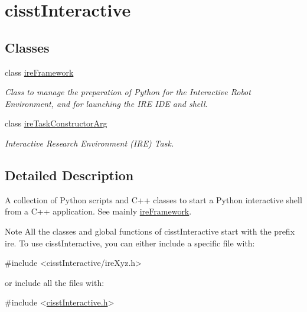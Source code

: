 \hypertarget{group__cisst_interactive}{\section{cisst\-Interactive}
\label{group__cisst_interactive}
}
\subsection*{Classes}
\begin{DoxyCompactItemize}
\item 
class \hyperlink{classire_framework}{ire\-Framework}
\begin{DoxyCompactList}\small\item\em Class to manage the preparation of Python for the Interactive Robot Environment, and for launching the I\-R\-E I\-D\-E and shell. \end{DoxyCompactList}\item 
class \hyperlink{classire_task_constructor_arg}{ire\-Task\-Constructor\-Arg}
\begin{DoxyCompactList}\small\item\em Interactive Research Environment (I\-R\-E) Task. \end{DoxyCompactList}\end{DoxyCompactItemize}


\subsection{Detailed Description}
A collection of Python scripts and C++ classes to start a Python interactive shell from a C++ application. See mainly \hyperlink{classire_framework}{ire\-Framework}.

\begin{DoxyNote}{Note}
All the classes and global functions of cisst\-Interactive start with the prefix ire. To use cisst\-Interactive, you can either include a specific file with\-: 
\begin{DoxyCode}
\textcolor{preprocessor}{#include <cisstInteractive/ireXyz.h>}
\end{DoxyCode}
 or include all the files with\-: 
\begin{DoxyCode}
\textcolor{preprocessor}{#include <\hyperlink{cisst_interactive_8h}{cisstInteractive.h}>}
\end{DoxyCode}
 
\end{DoxyNote}
